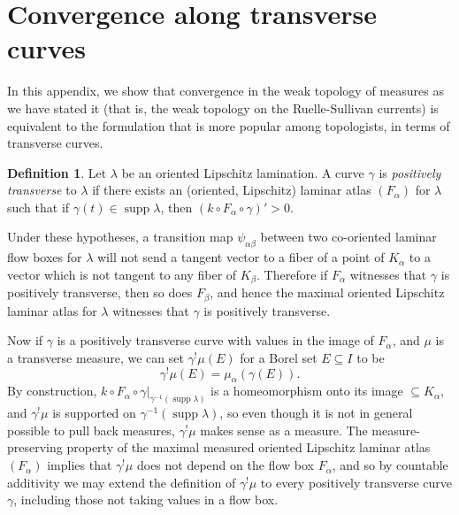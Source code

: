 \documentclass[reqno,11pt]{amsart}
\DeclareMathOperator{\supp}{supp}
\newcommand{\dfn}[1]{\emph{#1}\index{#1}}
\theoremstyle{definition}
\newtheorem{definition}[theorem]{Definition}
\numberwithin{equation}{section}
\begin{document}
\appendix \section{Convergence along transverse curves}\label{transverse curves}
In this appendix, we show that convergence in the weak topology of measures as we have stated it (that is, the weak topology on the Ruelle-Sullivan currents) is equivalent to the formulation that is more popular among topologists, in terms of transverse curves.

\begin{definition}
	Let $\lambda$ be an oriented Lipschitz lamination. A curve $\gamma$ is \dfn{positively transverse} to $\lambda$ if there exists an (oriented, Lipschitz) laminar atlas $(F_\alpha)$ for $\lambda$ such that if $\gamma(t) \in \supp \lambda$, then $(k \circ F_\alpha \circ \gamma)' > 0$.
\end{definition}

Under these hypotheses, a transition map $\psi_{\alpha \beta}$ between two co-oriented laminar flow boxes for $\lambda$ will not send a tangent vector to a fiber of a point of $K_\alpha$ to a vector which is not tangent to any fiber of $K_\beta$.
Therefore if $F_\alpha$ witnesses that $\gamma$ is positively transverse, then so does $F_\beta$, and hence the maximal oriented Lipschitz laminar atlas for $\lambda$ witnesses that $\gamma$ is positively transverse.

Now if $\gamma$ is a positively transverse curve with values in the image of $F_\alpha$, and $\mu$ is a transverse measure, we can set $\gamma^! \mu(E)$ for a Borel set $E \subseteq I$ to be
$$\gamma^! \mu(E) = \mu_\alpha(\gamma(E)).$$
By construction, $k \circ F_\alpha \circ \gamma|_{\gamma^{-1}(\supp \lambda)}$ is a homeomorphism onto its image $\subseteq K_\alpha$, and $\gamma^! \mu$ is supported on $\gamma^{-1}(\supp \lambda)$, so even though it is not in general possible to pull back measures, $\gamma^! \mu$ makes sense as a measure.
The measure-preserving property of the maximal measured oriented Lipschitz laminar atlas $(F_\alpha)$ implies that $\gamma^! \mu$ does not depend on the flow box $F_\alpha$, and so by countable additivity we may extend the definition of $\gamma^! \mu$ to every positively transverse curve $\gamma$, including those not taking values in a flow box.
\end{document}
